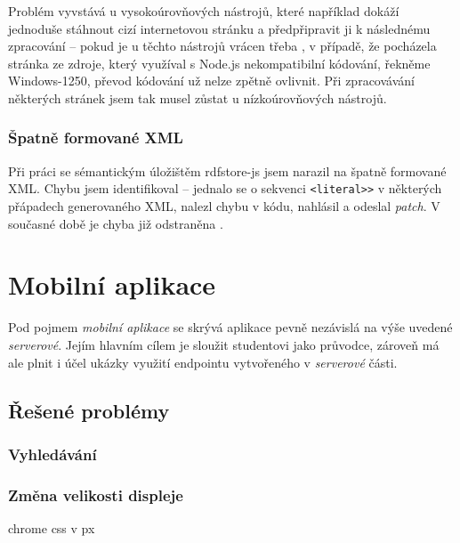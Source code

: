 Problém vyvstává u vysokoúrovňových nástrojů, které například dokáží jednoduše stáhnout cizí internetovou stránku a předpřipravit ji k následnému zpracování -- pokud je u těchto nástrojů vrácen třeba , v případě, že pocházela stránka ze zdroje, který využíval s Node.js nekompatibilní kódování, řekněme Windows-1250, převod kódování už nelze zpětně ovlivnit. Při zpracovávání některých stránek jsem tak musel zůstat u nízkoúrovňových nástrojů.

\subsubsection{Špatně formované XML}
Při práci se sémantickým úložištěm rdfstore-js jsem narazil na špatně formované XML. Chybu jsem identifikoval -- jednalo se o sekvenci \verb|<literal>>| v některých přápadech generovaného XML, nalezl chybu v kódu, nahlásil a odeslal \textit{patch}. V současné době je chyba již odstraněna \cite{IssueLiteral}.



\section{Mobilní aplikace}
Pod pojmem \textit{mobilní aplikace} se skrývá aplikace pevně nezávislá na výše uvedené \textit{serverové}. Jejím hlavním cílem je sloužit studentovi   jako průvodce, zároveň má ale plnit i účel ukázky využití  endpointu vytvořeného v \textit{serverové} části.


\subsection{Řešené problémy}

\subsubsection{Vyhledávání}

\subsubsection{Změna velikosti displeje}
chrome css v px

